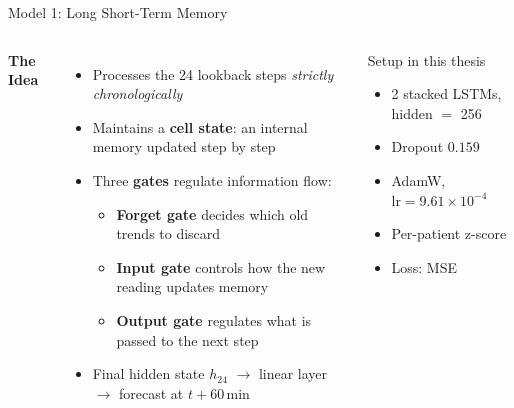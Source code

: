\begin{frame}[t]{Model 1: Long Short-Term Memory \cite{hochreiter1997lstm}}
  \begin{columns}[T]
    \textbf{The Idea}
    \begin{itemize}
      \item Processes the 24 lookback steps \emph{strictly chronologically}
      \item Maintains a \textbf{cell state}: an internal memory updated step by step
      \item Three \textbf{gates} regulate information flow:
        \begin{itemize}
          \small
          \item \textbf{Forget gate} decides which old trends to discard
          \item \textbf{Input gate} controls how the new reading updates memory
          \item \textbf{Output gate} regulates what is passed to the next step
        \end{itemize}
      \item Final hidden state $h_{24}$ $\to$ linear layer $\to$ forecast at $t{+}60$\,min
    \end{itemize}

    \vspace*{1cm}

    \begin{block}{Setup in this thesis}
      \begin{itemize}
        \item 2 stacked LSTMs, hidden $=$ 256
        \item Dropout $0.159$
        \item AdamW, $\text{lr}=9.61\!\times\!10^{-4}$
        \item Per-patient z-score
        \item Loss: MSE
      \end{itemize}
    \end{block}
  \end{columns}
\end{frame}

